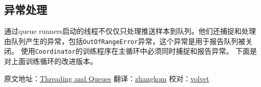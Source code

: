 \subsection{异常处理 }\label{ux5f02ux5e38ux5904ux7406}

通过queue
runners启动的线程不仅仅只处理推送样本到队列。他们还捕捉和处理由队列产生的异常，包括\texttt{OutOfRangeError}异常，这个异常是用于报告队列被关闭。
使用\texttt{Coordinator}的训练程序在主循环中必须同时捕捉和报告异常。
下面是对上面训练循环的改进版本。

\begin{Shaded}
\begin{Highlighting}[]
\NormalTok{:}
      \NormalTok{(}\NormalTok{):}
         
 

\end{Highlighting}
\end{Shaded}

原文地址：\href{https://github.com/jikexueyuanwiki/tensorflow-zh/blob/master/SOURCE/how_tos/threading_and_queues/index.md}{Threading
and Queues} 翻译：\href{https://github.com/zhangkom}{zhangkom}
校对：\href{https://github.com/volvet}{volvet}


